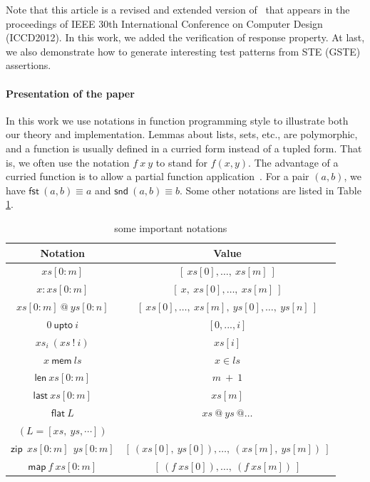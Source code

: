 \documentclass[final]{IEEEtran}
\begin{document}
Note that this article is a revised and extended version
of~\cite{ICCD2012} that appears in the proceedings of IEEE 30th
International Conference on Computer Design (ICCD2012). In this
work, we added the verification of response property. At last, we
also demonstrate how to generate interesting test patterns from STE
(GSTE) assertions.

\paragraph*{Presentation of the paper}

In this work we use notations in function programming style to
illustrate both our theory and implementation. Lemmas about lists,
sets, etc., are polymorphic, and a function is usually defined in a
curried form instead of a tupled form. That is, we often use the
notation $f~x~y$ to stand for $ f(x,y)$. The advantage of a curried
function is to allow a partial function application~\cite{Pau96}. %
For a pair $(a,b)$, we have $\mathsf{fst\ }(a,b)\equiv a$ and $\mathsf{snd\
}(a,b)\equiv b$. Some other notations are listed in Table \ref{notaions}.
\begin{center}
\begin{table}[tph]
\caption{some important notations}
\label{notaions}
\begin{tabular}{||c|c||}
\hline \hline
Notation & Value\\
\hline \hline
$xs[0:m]$ & $[\ xs[0],\dots,\ xs[m]\ ]$\\
\hline
$x:xs[0:m]$ & $[\ x,\ xs[0],\dots,\ xs[m]\ ]$ \\
\hline
$xs[0:m]\ @\ ys[0:n]$ & $[\ xs[0],\dots,\ xs[m],\ ys[0],\dots,\ ys[n]\ ]$\\
\hline
$0\ \mathsf{upto}\ i$ & $[0,...,i]$\\
\hline
$xs_{i}\ (xs\ !\ i)$ & $xs[i]$\\
\hline
$x\ \mathsf{mem}\ ls$ & $x\in ls$\\
\hline
$ \mathsf{len}~xs[0:m]$ & $m\ +\ 1$\\
\hline
$\mathsf{last}~xs[0:m]$ & $xs[m]$\\
\hline
$\mathsf{flat}\ L$ & $xs\ @\ ys \ @\dots$\\
$(L=[xs,\ ys,\cdots ])$ & \\
\hline
$\mathsf{zip\ }\ xs[0:m]\ \ ys[0:m]$ & $[\ (xs[0],\ ys[0]),\dots,\ (xs[m],\ ys[m])\ ]$\\
\hline
$\mathsf{map\ }f\mathsf{\ }xs[0:m]$ & $[\ (f\ xs[0]),\dots,\ (f\ xs[m])\ ]$\\

\hline \hline
\end{tabular}\\
\end{table}
\end{center}
\end{document}
